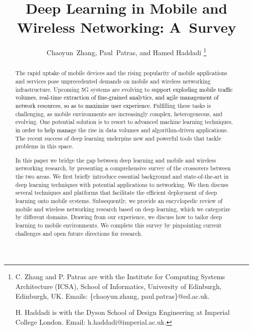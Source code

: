 \documentclass[journal,comsoc,letter]{IEEEtran}
\newcommand{\edit}[1]{\textcolor{black}{#1}}
\begin{document}
\title{Deep Learning in Mobile and Wireless Networking: \mbox{A Survey}}

\author{Chaoyun~Zhang,
        Paul~Patras, and Hamed Haddadi
\thanks{C. Zhang and P. Patras are with the Institute for Computing Systems Architecture (ICSA), School of Informatics, University of Edinburgh, Edinburgh, UK. Emails: \{chaoyun.zhang, paul.patras\}@ed.ac.uk. 

H. Haddadi is with the Dyson School of Design Engineering at Imperial College London. Email: h.haddadi@imperial.ac.uk.}}

\maketitle

\begin{abstract}
The rapid uptake of mobile devices and the rising popularity of mobile applications and services pose unprecedented demands on mobile and wireless networking infrastructure. Upcoming 5G systems are evolving to \edit{support exploding mobile traffic volumes, real-time extraction of fine-grained analytics, and agile management of network resources, so as to maximize user experience.} Fulfilling these tasks is challenging, as mobile environments are increasingly complex, heterogeneous, and evolving. One potential solution is to resort to advanced machine learning techniques, \edit{in order to help manage} the rise in data volumes and algorithm-driven applications. The recent success of deep learning underpins new and powerful tools that tackle problems in this space. 

In this paper we bridge the gap between deep learning and mobile and wireless networking research, by presenting a comprehensive survey of the crossovers between the two areas. We first briefly introduce essential background and state-of-the-art in deep learning techniques with potential applications to networking. We then discuss several techniques and platforms that facilitate the efficient deployment of deep learning onto mobile systems. Subsequently, we provide an encyclopedic review of mobile and wireless networking research based on deep learning, which we categorize by different domains. Drawing from our experience, we discuss how to tailor deep learning to mobile environments. We complete this survey by pinpointing current challenges and open future directions for research.  
\end{abstract}
\end{document}
